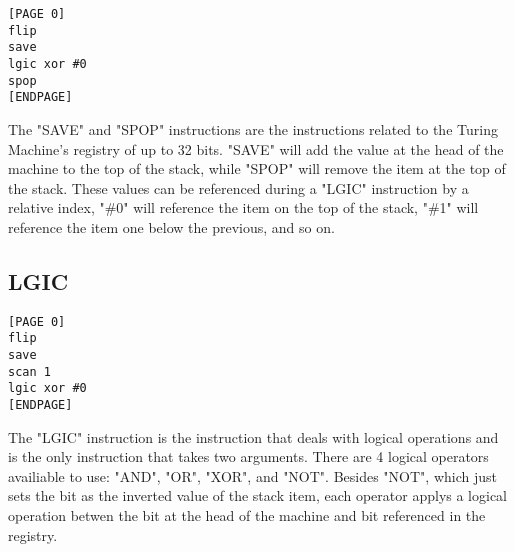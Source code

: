 \documentclass[11pt]{article}
\begin{document}
\begin{lstlisting}
[PAGE 0]
flip
save
lgic xor #0
spop
[ENDPAGE]
\end{lstlisting}

The "SAVE" and "SPOP" instructions are the instructions related to the Turing Machine's registry of up to 32 bits. "SAVE" will add the value at the head of the machine to the top of the stack, while "SPOP" will remove the item at the top of the stack. These values can be referenced during a "LGIC" instruction by a relative index, "\#0" will reference the item on the top of the stack, "\#1" will reference the item one below the previous, and so on.

\subsection{LGIC}

\begin{lstlisting}
[PAGE 0]
flip
save
scan 1
lgic xor #0
[ENDPAGE]
\end{lstlisting}

The "LGIC" instruction is the instruction that deals with logical operations and is the only instruction that takes two arguments. There are 4 logical operators availiable to use: "AND", "OR", "XOR", and "NOT". Besides "NOT", which just sets the bit as the inverted value of the stack item, each operator applys a logical operation betwen the bit at the head of the machine and bit referenced in the registry.
\end{document}
